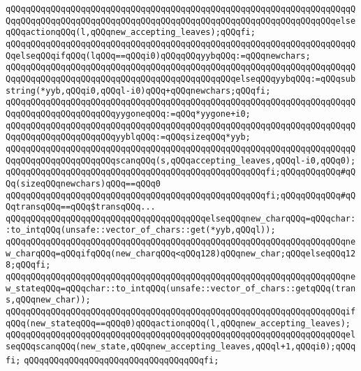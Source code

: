 \verb|qQQqqQQqqQQqqQQqqQQqqQQqqQQqqQQqqQQqqQQqqQQqqQQqqQQqqQQqqQQqqQQqqQQqqQQqqQQqqQQqqQQqqQQqqQQqqQQqqQQqqQQqqQQqqQQqqQQqqQQqqQQqqQQqqQQqqQQqelseqQQqactionqQQq(l,qQQqnew_accepting_leaves);qQQqfi;|\newline
\verb|qQQqqQQqqQQqqQQqqQQqqQQqqQQqqQQqqQQqqQQqqQQqqQQqqQQqqQQqqQQqqQQqqQQqqQQqelseqQQqifqQQq(lqQQq==qQQqi0)qQQqqQQqyybqQQq:=qQQqnewchars;|\newline
\verb|qQQqqQQqqQQqqQQqqQQqqQQqqQQqqQQqqQQqqQQqqQQqqQQqqQQqqQQqqQQqqQQqqQQqqQQqqQQqqQQqqQQqqQQqqQQqqQQqqQQqqQQqqQQqqQQqqQQqelseqQQqyybqQQq:=qQQqsubstring(*yyb,qQQqi0,qQQql-i0)qQQq+qQQqnewchars;qQQqfi;|\newline
\verb|qQQqqQQqqQQqqQQqqQQqqQQqqQQqqQQqqQQqqQQqqQQqqQQqqQQqqQQqqQQqqQQqqQQqqQQqqQQqqQQqqQQqqQQqqQQqyygoneqQQq:=qQQq*yygone+i0;|\newline
\verb|qQQqqQQqqQQqqQQqqQQqqQQqqQQqqQQqqQQqqQQqqQQqqQQqqQQqqQQqqQQqqQQqqQQqqQQqqQQqqQQqqQQqqQQqqQQqyyblqQQq:=qQQqsizeqQQq*yyb;|\newline
\verb|qQQqqQQqqQQqqQQqqQQqqQQqqQQqqQQqqQQqqQQqqQQqqQQqqQQqqQQqqQQqqQQqqQQqqQQqqQQqqQQqqQQqqQQqqQQqscanqQQq(s,qQQqaccepting_leaves,qQQql-i0,qQQq0);|\newline
\verb|qQQqqQQqqQQqqQQqqQQqqQQqqQQqqQQqqQQqqQQqqQQqqQQqqQQqfi;qQQqqQQqqQQq#qQQq(sizeqQQqnewchars)qQQq==qQQq0|\newline
\verb|qQQqqQQqqQQqqQQqqQQqqQQqqQQqqQQqqQQqqQQqqQQqqQQqqQQqfi;qQQqqQQqqQQq#qQQqtransqQQq==qQQq$transqQQq...|\newline
\verb|qQQqqQQqqQQqqQQqqQQqqQQqqQQqqQQqqQQqqQQqelseqQQqnew_charqQQq=qQQqchar::to_intqQQq(unsafe::vector_of_chars::get(*yyb,qQQql));|\newline
\verb|qQQqqQQqqQQqqQQqqQQqqQQqqQQqqQQqqQQqqQQqqQQqqQQqqQQqqQQqqQQqqQQqqQQqnew_charqQQq=qQQqifqQQq(new_charqQQq<qQQq128)qQQqnew_char;qQQqelseqQQq128;qQQqfi;|\newline
\verb|qQQqqQQqqQQqqQQqqQQqqQQqqQQqqQQqqQQqqQQqqQQqqQQqqQQqqQQqqQQqqQQqqQQqnew_stateqQQq=qQQqchar::to_intqQQq(unsafe::vector_of_chars::getqQQq(trans,qQQqnew_char));|\newline
\verb|qQQqqQQqqQQqqQQqqQQqqQQqqQQqqQQqqQQqqQQqqQQqqQQqqQQqqQQqqQQqqQQqqQQqifqQQq(new_stateqQQq==qQQq0)qQQqactionqQQq(l,qQQqnew_accepting_leaves);|\newline
\verb|qQQqqQQqqQQqqQQqqQQqqQQqqQQqqQQqqQQqqQQqqQQqqQQqqQQqqQQqqQQqqQQqqQQqelseqQQqscanqQQq(new_state,qQQqnew_accepting_leaves,qQQql+1,qQQqi0);qQQqfi;|\newline
\verb|qQQqqQQqqQQqqQQqqQQqqQQqqQQqqQQqqQQqfi;|\newline
